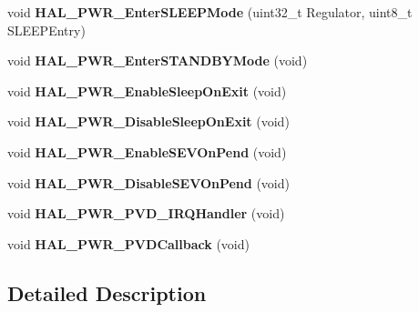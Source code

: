 \begin{DoxyCompactItemize}
\item 
\hypertarget{group___p_w_r___exported___functions___group2_ga5c84f4e046525c22d233c8a3443fab5f}{void {\bfseries H\-A\-L\-\_\-\-P\-W\-R\-\_\-\-Enter\-S\-L\-E\-E\-P\-Mode} (uint32\-\_\-t Regulator, uint8\-\_\-t S\-L\-E\-E\-P\-Entry)}\label{group___p_w_r___exported___functions___group2_ga5c84f4e046525c22d233c8a3443fab5f}

\item 
\hypertarget{group___p_w_r___exported___functions___group2_ga40736f74c169077fcd08f34470559aa2}{void {\bfseries H\-A\-L\-\_\-\-P\-W\-R\-\_\-\-Enter\-S\-T\-A\-N\-D\-B\-Y\-Mode} (void)}\label{group___p_w_r___exported___functions___group2_ga40736f74c169077fcd08f34470559aa2}

\item 
\hypertarget{group___p_w_r___exported___functions___group2_ga85d0154c96068b286072a64fca4c7e6a}{void {\bfseries H\-A\-L\-\_\-\-P\-W\-R\-\_\-\-Enable\-Sleep\-On\-Exit} (void)}\label{group___p_w_r___exported___functions___group2_ga85d0154c96068b286072a64fca4c7e6a}

\item 
\hypertarget{group___p_w_r___exported___functions___group2_ga1da299e8186a3e08a694865bd41c3bb0}{void {\bfseries H\-A\-L\-\_\-\-P\-W\-R\-\_\-\-Disable\-Sleep\-On\-Exit} (void)}\label{group___p_w_r___exported___functions___group2_ga1da299e8186a3e08a694865bd41c3bb0}

\item 
\hypertarget{group___p_w_r___exported___functions___group2_ga6f33b1c8c8cc85129c68ac302a281033}{void {\bfseries H\-A\-L\-\_\-\-P\-W\-R\-\_\-\-Enable\-S\-E\-V\-On\-Pend} (void)}\label{group___p_w_r___exported___functions___group2_ga6f33b1c8c8cc85129c68ac302a281033}

\item 
\hypertarget{group___p_w_r___exported___functions___group2_ga7811014def9b864dd490a63ada4bab68}{void {\bfseries H\-A\-L\-\_\-\-P\-W\-R\-\_\-\-Disable\-S\-E\-V\-On\-Pend} (void)}\label{group___p_w_r___exported___functions___group2_ga7811014def9b864dd490a63ada4bab68}

\item 
\hypertarget{group___p_w_r___exported___functions___group2_gae3403237bde597d72b32f0434932a047}{void {\bfseries H\-A\-L\-\_\-\-P\-W\-R\-\_\-\-P\-V\-D\-\_\-\-I\-R\-Q\-Handler} (void)}\label{group___p_w_r___exported___functions___group2_gae3403237bde597d72b32f0434932a047}

\item 
\hypertarget{group___p_w_r___exported___functions___group2_gaa4843b3eb7989f5b95e1218af4086940}{void {\bfseries H\-A\-L\-\_\-\-P\-W\-R\-\_\-\-P\-V\-D\-Callback} (void)}\label{group___p_w_r___exported___functions___group2_gaa4843b3eb7989f5b95e1218af4086940}

\end{DoxyCompactItemize}


\subsection{Detailed Description}
